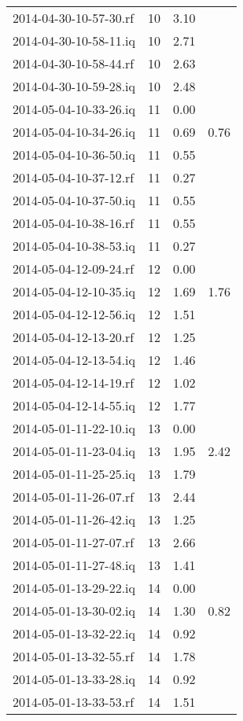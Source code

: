 \begin{center}
\begin{longtable}{@{}l p{1cm} p{3cm} p{3cm} @{}}
		2014-04-30-10-57-30.rf & 10 & 3.10 &  \\ 
		2014-04-30-10-58-11.iq & 10 & 2.71 &  \\ 
		2014-04-30-10-58-44.rf & 10 & 2.63 &  \\ 
		2014-04-30-10-59-28.iq & 10 & 2.48 &  \\ 
		2014-05-04-10-33-26.iq & 11 & 0.00 &  \\ 
		2014-05-04-10-34-26.iq & 11 & 0.69 & 0.76 \\ 
		2014-05-04-10-36-50.iq & 11 & 0.55 &  \\ 
		2014-05-04-10-37-12.rf & 11 & 0.27 &  \\ 
		2014-05-04-10-37-50.iq & 11 & 0.55 &  \\ 
		2014-05-04-10-38-16.rf & 11 & 0.55 &  \\ 
		2014-05-04-10-38-53.iq & 11 & 0.27 &  \\ 
		2014-05-04-12-09-24.rf & 12 & 0.00 &  \\ 
		2014-05-04-12-10-35.iq & 12 & 1.69 & 1.76 \\ 
		2014-05-04-12-12-56.iq & 12 & 1.51 &  \\ 
		2014-05-04-12-13-20.rf & 12 & 1.25 &  \\ 
		2014-05-04-12-13-54.iq & 12 & 1.46 &  \\ 
		2014-05-04-12-14-19.rf & 12 & 1.02 &  \\ 
		2014-05-04-12-14-55.iq & 12 & 1.77 &  \\ 
		2014-05-01-11-22-10.iq & 13 & 0.00 &  \\ 
		2014-05-01-11-23-04.iq & 13 & 1.95 & 2.42 \\ 
		2014-05-01-11-25-25.iq & 13 & 1.79 &  \\ 
		2014-05-01-11-26-07.rf & 13 & 2.44 &  \\ 
		2014-05-01-11-26-42.iq & 13 & 1.25 &  \\ 
		2014-05-01-11-27-07.rf & 13 & 2.66 &  \\ 
		2014-05-01-11-27-48.iq & 13 & 1.41 &  \\ 
		2014-05-01-13-29-22.iq & 14 & 0.00 &  \\ 
		2014-05-01-13-30-02.iq & 14 & 1.30 & 0.82 \\ 
		2014-05-01-13-32-22.iq & 14 & 0.92 &  \\ 
		2014-05-01-13-32-55.rf & 14 & 1.78 &  \\ 
		2014-05-01-13-33-28.iq & 14 & 0.92 &  \\ 
		2014-05-01-13-33-53.rf & 14 & 1.51 &  \\ 

\end{longtable}
\end{center}
